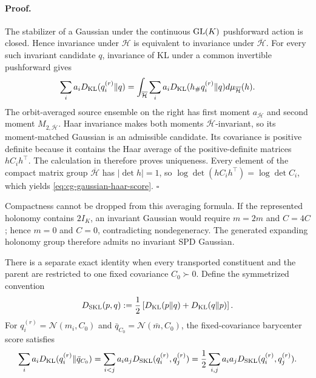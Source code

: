 \paragraph{Proof.}
The stabilizer of a Gaussian under the continuous \(\mathrm{GL}(K)\) pushforward
action is closed. Hence invariance under \(\mathcal H\) is equivalent to
invariance under \(\overline{\mathcal H}\). For every such invariant
candidate \(q\), invariance of KL under a common invertible pushforward gives
\begin{equation}
\sum_i a_iD_{\mathrm{KL}}(q_i^{(r)}\Vert q)
=\int_{\overline{\mathcal H}}\sum_i a_i
D_{\mathrm{KL}}(h_\#q_i^{(r)}\Vert q)d\mu_{\overline{\mathcal H}}(h).
\label{eq:cg-haar-objective-average}
\end{equation}
The orbit-averaged source ensemble on the right has first moment
\(a_{\overline{\mathcal H}}\) and second moment
\(M_{2,\overline{\mathcal H}}\). Haar invariance makes both moments
\(\overline{\mathcal H}\)-invariant, so its moment-matched Gaussian
is an admissible candidate. Its covariance is positive definite because it
contains the Haar average of the positive-definite matrices \(hC_ih^\top\).
The calculation in
 therefore proves uniqueness.
Every element of the compact matrix group
\(\overline{\mathcal H}\) has \(\lvert\det h\rvert=1\), so
\(\log\det(hC_ih^\top)=\log\det C_i\), which yields
\eqref{eq:cg-gaussian-haar-score}. \(\square\)

Compactness cannot be dropped from this averaging formula. If the represented
holonomy contains \(2I_K\), an invariant Gaussian would require
\(m=2m\) and \(C=4C\); hence \(m=0\) and \(C=0\), contradicting
nondegeneracy. The generated expanding holonomy group therefore admits no
invariant SPD Gaussian. 

There is a separate exact identity when every transported constituent and
the parent are restricted to one fixed covariance \(C_0\succ0\). Define the
symmetrized convention
\begin{equation}
D_{\rm SKL}(p,q)
:=\frac12\left[D_{\mathrm{KL}}(p\Vert q)+D_{\mathrm{KL}}(q\Vert p)\right].
\label{eq:cg-symmetric-kl-convention}
\end{equation}
For \(q_i^{(r)}=\mathcal N(m_i,C_0)\) and
\(\bar q_{C_0}=\mathcal N(\bar m,C_0)\), the fixed-covariance barycenter
score satisfies
\begin{equation}
\sum_i a_iD_{\mathrm{KL}}(q_i^{(r)}\Vert\bar q_{C_0})
=\sum_{i<j}a_ia_jD_{\rm SKL}(q_i^{(r)},q_j^{(r)})
=\frac12\sum_{i,j}a_ia_jD_{\rm SKL}(q_i^{(r)},q_j^{(r)}).
\label{eq:cg-fixed-covariance-pairwise-identity}
\end{equation}


